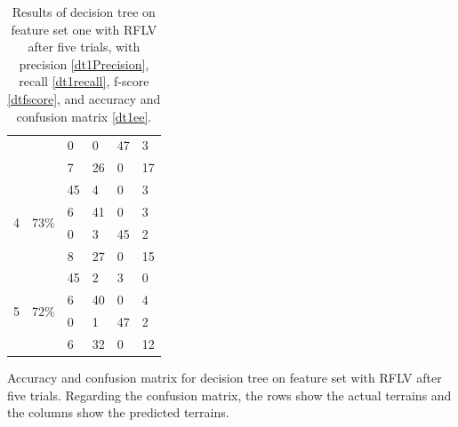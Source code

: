 \documentclass[USenglish]{ifimaster}  %
\begin{document}
\begin{table}[h]
\begin{subtable}[h]{1\textwidth}
\begin{tabular}{@{}llllll@{}}
			\multicolumn{1}{l|}{} & \multicolumn{1}{l|}{} & \multicolumn{1}{l|}{0} & \multicolumn{1}{l|}{0} & \multicolumn{1}{l|}{47} & 3 \\ \cmidrule(l){3-6} 
			\multicolumn{1}{l|}{} & \multicolumn{1}{l|}{} & \multicolumn{1}{l|}{7} & \multicolumn{1}{l|}{26} & \multicolumn{1}{l|}{0} & 17 \\ \midrule
			\multicolumn{1}{l|}{\multirow{4}{*}{4}} & \multicolumn{1}{l|}{\multirow{4}{*}{73\%}} & \multicolumn{1}{l|}{45} & \multicolumn{1}{l|}{4} & \multicolumn{1}{l|}{0} & 3 \\ \cmidrule(l){3-6} 
			\multicolumn{1}{l|}{} & \multicolumn{1}{l|}{} & \multicolumn{1}{l|}{6} & \multicolumn{1}{l|}{41} & \multicolumn{1}{l|}{0} & 3 \\ \cmidrule(l){3-6} 
			\multicolumn{1}{l|}{} & \multicolumn{1}{l|}{} & \multicolumn{1}{l|}{0} & \multicolumn{1}{l|}{3} & \multicolumn{1}{l|}{45} & 2 \\ \cmidrule(l){3-6} 
			\multicolumn{1}{l|}{} & \multicolumn{1}{l|}{} & \multicolumn{1}{l|}{8} & \multicolumn{1}{l|}{27} & \multicolumn{1}{l|}{0} & 15 \\ \midrule
			\multicolumn{1}{l|}{\multirow{4}{*}{5}} & \multicolumn{1}{l|}{\multirow{4}{*}{72\%}} & \multicolumn{1}{l|}{45} & \multicolumn{1}{l|}{2} & \multicolumn{1}{l|}{3} & 0 \\ \cmidrule(l){3-6} 
			\multicolumn{1}{l|}{} & \multicolumn{1}{l|}{} & \multicolumn{1}{l|}{6} & \multicolumn{1}{l|}{40} & \multicolumn{1}{l|}{0} & 4 \\ \cmidrule(l){3-6} 
			\multicolumn{1}{l|}{} & \multicolumn{1}{l|}{} & \multicolumn{1}{l|}{0} & \multicolumn{1}{l|}{1} & \multicolumn{1}{l|}{47} & 2 \\ \cmidrule(l){3-6} 
			\multicolumn{1}{l|}{} & \multicolumn{1}{l|}{} & \multicolumn{1}{l|}{6} & \multicolumn{1}{l|}{32} & \multicolumn{1}{l|}{0} & 12 \\ \bottomrule
		\end{tabular}
		\caption{Accuracy and confusion matrix for decision tree on feature set with RFLV after five trials. Regarding the confusion matrix, the rows show the actual terrains and the columns show the predicted terrains.}
		\label{dt1ee}
		\end{subtable}
	\caption[Results of SVM on feature set three with RFE]{Results of decision tree on feature set one with RFLV after five trials, with precision \ref{dt1Precision}, recall \ref{dt1recall}, f-score \ref{dtfscore}, and accuracy and confusion matrix \ref{dt1ee}.}
\label{dt43}
\end{table}
\FloatBarrier
\newpage
\end{document}
